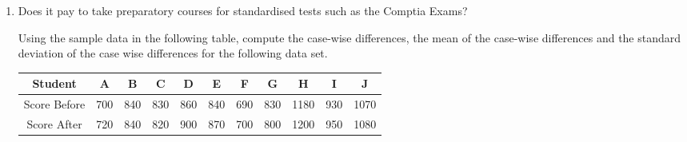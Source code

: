 \documentclass[a4paper,12pt]{article}
\begin{document}
\begin{enumerate}
\item Does it pay to take preparatory courses for standardised tests such as the Comptia Exams? 

Using the sample data in the following table, compute the case-wise differences, the mean of the case-wise differences and the standard deviation of the case wise differences for the following data set.

\begin{center}
	\begin{tabular}{|c|c|c|c|c|c|c|c|c|c|c|}
		\hline  
		Student	&	A	&	B	&	C	&	D	&	E	&	F	&	G	&	H	&	I	&	J	\\ \hline
		Score Before	&	700	&	840	&	830	&	860	&	840	&	690	&	830	&	1180	&	930	&	1070	\\ \hline
		Score After	&	720	&	840	&	820	&	900	&	870	&	700	&	800	&	1200	&	950	&	1080	\\ \hline
	\end{tabular} 
\end{center}

 \end{enumerate}
 
\end{document}
